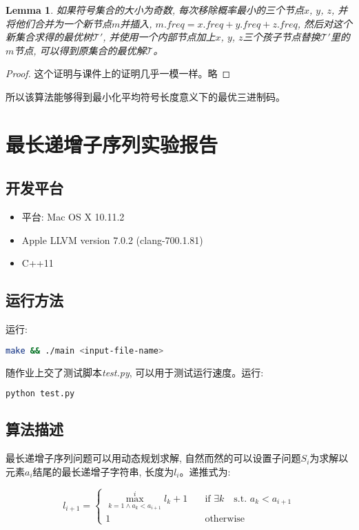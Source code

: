 \documentclass[paper=a4, fontsize=11pt]{scrartcl} %
\numberwithin{equation}{section} %
\numberwithin{figure}{section} %
\numberwithin{table}{section} %
\newtheorem{lemma}[theorem]{Lemma}
\begin{document}
\begin{lemma}
  如果符号集合的大小为奇数, 每次移除概率最小的三个节点$x$, $y$, $z$, 并将他们合并为一个新节点$m$并插入, $m.freq = x.freq + y.freq + z.freq$, 然后对这个新集合求得的最优树$\mathscr{T'}$, 并使用一个内部节点加上$x$, $y$, $z$三个孩子节点替换$\mathscr{T'}$里的$m$节点, 可以得到原集合的最优解$\mathscr{T}$。
\end{lemma}
\begin{proof}
  这个证明与课件上的证明几乎一模一样。略
\end{proof}

所以该算法能够得到最小化平均符号长度意义下的最优三进制码。

\section {最长递增子序列实验报告}

\subsection{开发平台}

\begin{itemize}
\item 平台: Mac OS X 10.11.2
\item Apple LLVM version 7.0.2 (clang-700.1.81)
\item C++11
\end{itemize}

\subsection{运行方法}

运行:
\begin{lstlisting}[language=bash]
  make && ./main <input-file-name>
\end{lstlisting}

随作业上交了测试脚本\textit{test.py}, 可以用于测试运行速度。运行:
\begin{lstlisting}[language=bash]
  python test.py
\end{lstlisting}

\subsection{算法描述}

最长递增子序列问题可以用动态规划求解, 自然而然的可以设置子问题$S_i$为求解以元素$a_i$结尾的最长递增子字符串, 长度为$l_i$。递推式为:

\[
l_{i+1} =
\begin{cases}
  \max_{k=1 \land a_k < a_{i+1}}^{i}{l_k} + 1 & \quad \text{if } \exists k \quad \mbox{s.t. } a_k < a_{i+1}\\
  1 & \quad \text{otherwise}
\end{cases}
\]
\end{document}
